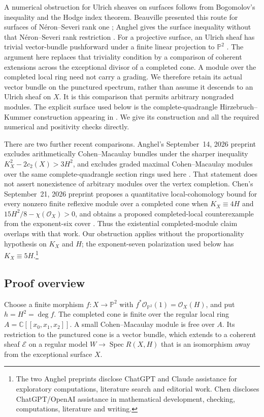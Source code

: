 \documentclass[11pt]{article}
\theoremstyle{remark}
\newcommand{\C}{\mathbb C}
\newcommand{\PP}{\mathbb P}
\newcommand{\cO}{\mathcal O}
\newcommand{\cE}{\mathcal E}
\DeclareMathOperator{\Spec}{Spec}
\begin{document}
A numerical obstruction for Ulrich sheaves on surfaces follows from
Bogomolov's inequality and the Hodge index theorem. Beauville presented
this route for surfaces of N\'eron--Severi rank one
\cite[pp.~18--20]{Beauville2017}; Anghel gives the surface inequality
without that N\'eron--Severi rank restriction
\cite[Proposition~2.1 and Remark~2.3]{Anghel2026}.
For a projective surface, an Ulrich sheaf has trivial vector-bundle
pushforward under a finite linear projection to $\PP^2$
\cite[Proposition 2.1]{EisenbudSchreyer2003}. The argument
here replaces that triviality condition by a comparison of coherent
extensions across the exceptional divisor of a completed cone.
A module over the completed local ring need not carry a grading.
We therefore retain its actual vector bundle on the punctured spectrum,
rather than assume it descends to an Ulrich sheaf on $X$.
It is this comparison that permits arbitrary nongraded modules.
The explicit surface used below is the complete-quadrangle
Hirzebruch--Kummer construction appearing in \cite[Section 7.2]{Anghel2026}.
We give its construction and all the required numerical and positivity
checks directly.

There are two further recent comparisons. Anghel's September~14, 2026
preprint excludes arithmetically Cohen--Macaulay bundles under the
sharper inequality $K_X^2-2c_2(X)>3H^2$, and excludes graded maximal
Cohen--Macaulay modules over the same complete-quadrangle section rings
used here \cite[Theorems~1.1 and 1.3, Corollary~4.3]{Anghel2026Graded}.
That statement does not assert nonexistence of arbitrary modules over
the vertex completion. Chen's September~21, 2026 preprint proposes a
quantitative local-cohomology bound for every nonzero finite reflexive
module over a completed cone when $K_X\equiv4H$ and
$15H^2/8-\chi(\cO_X)>0$, and obtains a proposed completed-local
counterexample from the exponent-six cover
\cite[Main claim~1.1 and Consequence~1.2]{Chen2026}.
Thus the existential completed-module claim overlaps with that work.
Our obstruction applies without the proportionality hypothesis on
$K_X$ and $H$; the exponent-seven polarization used below has
$K_X\equiv5H$.\footnote{The two Anghel preprints disclose ChatGPT and
Claude assistance for exploratory computations, literature search and
editorial work. Chen discloses ChatGPT/OpenAI assistance in mathematical
development, checking, computations, literature and writing.}

\subsection*{Proof overview}
Choose a finite morphism $f:X\to\PP^2$ with
$f^*\cO_{\PP^2}(1)=\cO_X(H)$, and put $h=H^2=\deg f$.
The completed cone is finite over the regular local ring
$A=\C[[x_0,x_1,x_2]]$. A small Cohen--Macaulay module is free over $A$.
Its restriction to the punctured cone is a vector bundle, which extends
to a coherent sheaf $\cE$ on a regular model $W\to\Spec R(X,H)$
that is an isomorphism away from the exceptional surface $X$.
\end{document}
